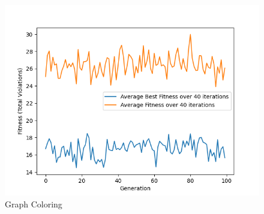 \documentclass[11pt, letterpaper]{article}
\begin{document}
\begin{figure}[!h]
  \includegraphics[width=\linewidth]{images/graphcoloring_fp_rd.png}
  \caption{Graph Coloring}
\endminipage
\end{figure}
\end{document}
